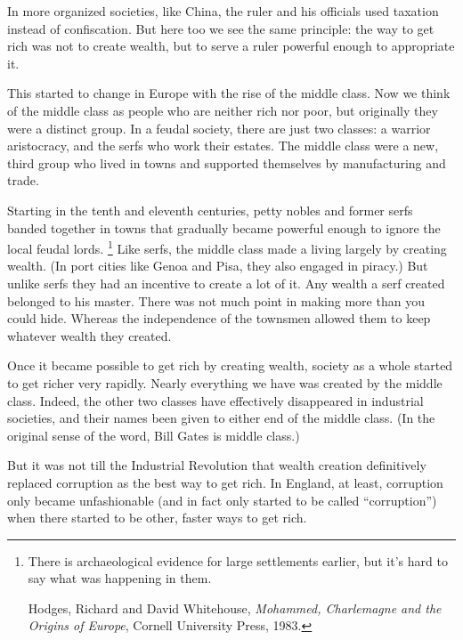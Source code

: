 In more organized societies, like China, the ruler and his officials
used taxation instead of confiscation. But here too we see the same
principle: the way to get rich was not to create wealth, but to serve a
ruler powerful enough to appropriate it.

This started to change in Europe with the rise of the middle class. Now
we think of the middle class as people who are neither rich nor poor,
but originally they were a distinct group. In a feudal society, there
are just two classes: a warrior aristocracy, and the serfs who work
their estates. The middle class were a new, third group who lived in
towns and supported themselves by manufacturing and trade.

Starting in the tenth and eleventh centuries, petty nobles and former
serfs banded together in towns that gradually became powerful enough to
ignore the local feudal lords. \footnote{There is archaeological evidence for large settlements earlier,
but it's hard to say what was happening in them.

Hodges, Richard and David Whitehouse, \emph{Mohammed, Charlemagne and
the Origins of Europe}, Cornell University Press, 1983.} Like serfs, the
middle class made a living largely by creating wealth. (In port cities
like Genoa and Pisa, they also engaged in piracy.) But unlike serfs they
had an incentive to create a lot of it. Any wealth a serf created
belonged to his master. There was not much point in making more than you
could hide. Whereas the independence of the townsmen allowed them to
keep whatever wealth they created.

Once it became possible to get rich by creating wealth, society as a
whole started to get richer very rapidly. Nearly everything we have was
created by the middle class. Indeed, the other two classes have
effectively disappeared in industrial societies, and their names been
given to either end of the middle class. (In the original sense of the
word, Bill Gates is middle class.)

But it was not till the Industrial Revolution that wealth creation
definitively replaced corruption as the best way to get rich. In
England, at least, corruption only became unfashionable (and in fact
only started to be called ``corruption'') when there started to be
other, faster ways to get rich.


